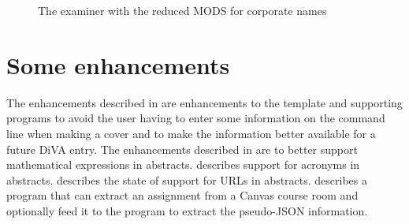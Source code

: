 \begin{figure}[!ht]
  \begin{center}
  \end{center}
  \caption{The examiner with the reduced MODS for corporate names}
  \label{fig:examinerReducedMODS}
\end{figure}
\clearpage

\section{Some enhancements}
\label{sec:someEhnahncements}
The enhancements described in  are enhancements to the template and supporting programs to avoid the user having to enter some information on the command line when making a cover and to make the information better available for a future DiVA entry. The enhancements described in  are to better support mathematical expressions in abstracts.  describes support for acronyms in abstracts.  describes the state of support for URLs in abstracts.  describes a program that can extract an assignment from a Canvas course room and optionally feed it to the program to extract the pseudo-JSON information.


